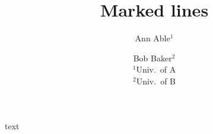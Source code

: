 \documentclass{article}
\begin{document}
\title{Marked lines}
\author{Ann Able$^{1}$ \and Bob Baker$^{2}$ \\ $^{1}$Univ.\ of A \\ $^{2}$Univ.\ of B}
\date{}
\maketitle
text
\end{document}
